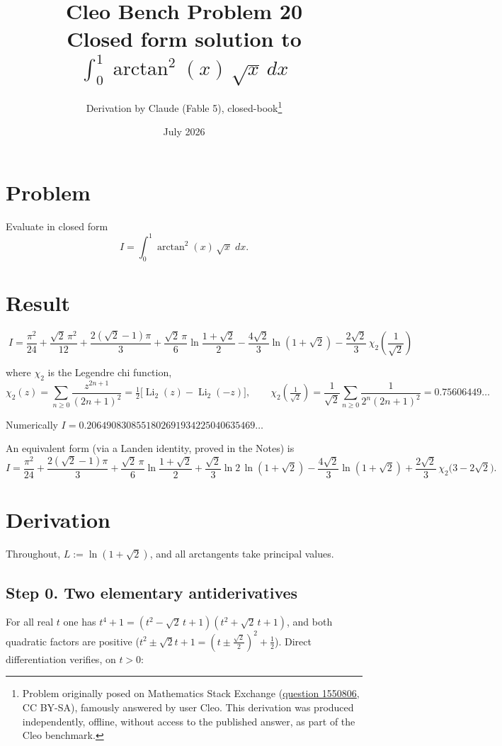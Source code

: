 \documentclass[11pt]{article}
\title{Cleo Bench Problem 20\\[1ex]\large Closed form solution to $\int_0^1\arctan^2(x)\,\sqrt{x}\,dx$}
\author{Derivation by Claude (Fable 5), closed-book\thanks{Problem originally
posed on Mathematics Stack Exchange
(\href{https://math.stackexchange.com/q/1550806}{question 1550806}, CC BY-SA),
famously answered by user Cleo. This derivation was produced independently,
offline, without access to the published answer, as part of the Cleo benchmark.}}
\date{July 2026}
\theoremstyle{remark}
\begin{document}
\maketitle

\section*{Problem}

Evaluate in closed form
\[I=\int_0^1\arctan^2(x)\,\sqrt{x}\;dx .\]

\section*{Result}

\[\boxed{\;I=\frac{\pi^2}{24}+\frac{\sqrt2\,\pi^2}{12}+\frac{2(\sqrt2-1)\pi}{3}
+\frac{\sqrt2\,\pi}{6}\ln\!\frac{1+\sqrt2}{2}
-\frac{4\sqrt2}{3}\ln\!\left(1+\sqrt2\right)
-\frac{2\sqrt2}{3}\,\chi_2\!\left(\frac{1}{\sqrt2}\right)\;}\]

where $\chi_2$ is the Legendre chi function,
\[\chi_2(z)=\sum_{n\ge0}\frac{z^{2n+1}}{(2n+1)^2}
=\tfrac12\bigl[\operatorname{Li}_2(z)-\operatorname{Li}_2(-z)\bigr],
\qquad
\chi_2\!\left(\tfrac1{\sqrt2}\right)=\frac{1}{\sqrt2}\sum_{n\ge 0}\frac{1}{2^n(2n+1)^2}=0.75606449\ldots\]

Numerically $I=0.2064908308551802691934225040635469\ldots$

An equivalent form (via a Landen identity, proved in the Notes) is
\[I=\frac{\pi^2}{24}+\frac{2(\sqrt2-1)\pi}{3}
+\frac{\sqrt2\,\pi}{6}\ln\!\frac{1+\sqrt2}{2}
+\frac{\sqrt2}{3}\ln 2\,\ln(1+\sqrt2)
-\frac{4\sqrt2}{3}\ln(1+\sqrt2)
+\frac{2\sqrt2}{3}\,\chi_2\!\bigl(3-2\sqrt2\bigr).\]

\section*{Derivation}

Throughout, $L:=\ln(1+\sqrt2)$, and all arctangents take principal values.

\subsection*{Step 0. Two elementary antiderivatives}

For all real $t$ one has $t^4+1=(t^2-\sqrt2\,t+1)(t^2+\sqrt2\,t+1)$, and both quadratic factors are positive ($t^2\pm\sqrt2 t+1=(t\pm\tfrac{\sqrt2}{2})^2+\tfrac12$). Direct differentiation verifies, on $t>0$:
\end{document}
